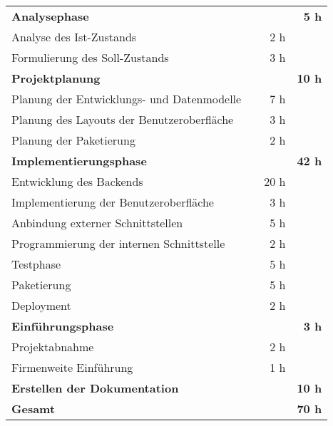 \begin{tabularx}{\textwidth}{Xrrr}
\rowcolor{heading}\textbf{Analysephase} & \textbf{} & \textbf{} & \textbf{5 h} \\
Analyse des Ist-Zustands &       & 2 h   &  \\
\rowcolor{odd}Formulierung des Soll-Zustands &       & 3 h   &  \\
\rowcolor{heading}\textbf{Projektplanung} & \textbf{} & \textbf{} & \textbf{10 h} \\
Planung der Entwicklungs- und Datenmodelle &       & 7 h   &  \\
\rowcolor{odd}Planung des Layouts der Benutzeroberfläche &       & 3 h   &  \\
Planung der Paketierung &       & 2 h   &  \\
\rowcolor{heading}\textbf{Implementierungsphase} & \textbf{} & \textbf{} & \textbf{42 h} \\
Entwicklung des Backends &       & 20 h   &  \\
\rowcolor{odd} Implementierung der Benutzeroberfläche &       & 3 h   &  \\
Anbindung externer Schnittstellen &       & 5 h  &  \\
\rowcolor{odd}Programmierung der internen Schnittstelle &       & 2 h   &  \\
Testphase &       & 5 h   &  \\
\rowcolor{odd}Paketierung &       & 5 h   &  \\
Deployment &       & 2 h   &  \\
\rowcolor{heading}\textbf{Einführungsphase} & \textbf{} & \textbf{} & \textbf{3 h} \\
Projektabnahme &       & 2 h   &  \\
Firmenweite Einführung &      & 1 h   &  \\
\rowcolor{heading}\textbf{Erstellen der Dokumentation} & \textbf{} & \textbf{} & \textbf{10 h} \\
\hline
\hline
\rowcolor{heading}\textbf{Gesamt} & \textbf{} & \textbf{} & \textbf{70 h} \\
\end{tabularx}
